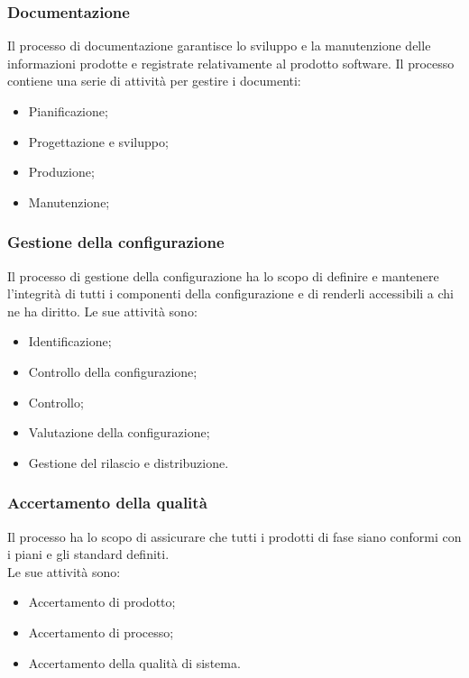 \subsubsection{Documentazione}
Il processo di documentazione garantisce lo sviluppo e la manutenzione delle informazioni prodotte e registrate relativamente al prodotto software. Il processo contiene una serie di attività per gestire i documenti:
\begin{itemize}

	\item Pianificazione;

	\item Progettazione e sviluppo;
	
	\item Produzione;
	
	\item Manutenzione;

\end{itemize}

\subsubsection{Gestione della configurazione}
Il processo di gestione della configurazione ha lo scopo di definire e mantenere l'integrità di tutti i componenti della configurazione e di renderli accessibili a chi ne ha diritto. Le sue attività sono:
\begin{itemize}

	\item Identificazione;
	
	\item Controllo della configurazione;
	
	\item Controllo; 	
	
	\item Valutazione della configurazione;
	
	\item Gestione del rilascio e distribuzione.

\end{itemize}

\subsubsection{Accertamento della qualità}
Il processo ha lo scopo di assicurare che tutti i prodotti di fase siano conformi con i piani e gli standard definiti. \\
Le sue attività sono:
\begin{itemize}

	\item Accertamento di prodotto;
	
	\item Accertamento di processo;
	
	\item Accertamento della qualità di sistema.

\end{itemize}

